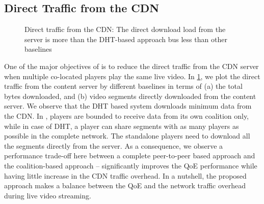 \subsection{Direct Traffic from the CDN} 
\begin{figure}[!ht]
	\captionsetup[subfigure]{width=0.49\linewidth}
	\begin{center}
	\end{center}
	\caption{\label{fig:chap06:cdnuploaded}Direct traffic from the \acs{CDN}: The direct download load from the server is more than the DHT-based approach bus less than other baselines}
\end{figure}
One of the major objectives of {\our} is to reduce the direct traffic from the \ac{CDN} server when multiple co-located players play the same live video. In \fig\ref{fig:chap06:cdnuploaded}, we plot the direct traffic from the content server by different baselines in terms of (a) the total bytes downloaded, and (b) video segments directly downloaded from the content server. We observe that the DHT based system downloads minimum data from the \ac{CDN}. In \our, players are bounded to receive data from its own coalition only, while in case of DHT, a player can share segments with as many players as possible in the complete network. The standalone players need to download all the segments directly from the server. As a consequence, we observe a performance trade-off here between a complete peer-to-peer based approach and the coalition-based approach -- {\our} significantly improves the \ac{QoE} performance while having little increase in the \ac{CDN} traffic overhead. In a nutshell, the proposed approach makes a balance between the \ac{QoE} and the network traffic overhead during live video streaming.

